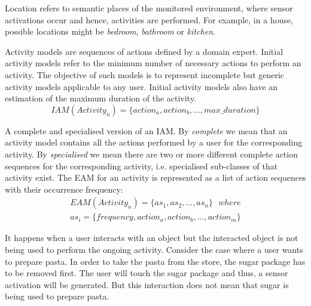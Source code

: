 \begin{defn}[Location]
\label{def-location}
 Location refers to semantic places of the monitored environment, where sensor activations occur and hence, activities are performed. For example, in a house, possible locations might be \textit{bedroom}, \textit{bathroom} or \textit{kitchen}. 
\end{defn}

\begin{defn}
\label{def-iam}
Activity models are sequences of actions defined by a domain expert. Initial activity models refer to the minimum number of necessary actions to perform an activity. The objective of such models is to represent incomplete but generic activity models applicable to any user. Initial activity models also have an estimation of the maximum duration of the activity.
\begin{equation}
  IAM(Activity_n) = \{action_a, action_b, \ldots , max\_duration\}
 \end{equation} 
\end{defn}

\begin{defn}
\label{def-eam}
 A complete and specialised version of an IAM. By \textit{complete} we mean that an activity model contains all the actions performed by a user for the corresponding activity. By \textit{specialised} we mean there are two or more different complete action sequences for the corresponding activity, i.e. specialised sub-classes of that activity exist. The EAM for an activity is represented as a list of action sequences with their occurrence frequency:
\begin{equation}
 \begin{split}
 EAM(Activity_n) = \{as_1, as_2, \ldots , as_n\} \ \ \ where \\
 as_i = \{frequency, action_a, action_b, \ldots, action_m\}
 \end{split}
 \label{eq-eam}
\end{equation}
\end{defn}

\begin{defn}
\label{def-erratic}
 It happens when a user interacts with an object but the interacted object is not being used to perform the ongoing activity. Consider the case where a user wants to prepare pasta. In order to take the pasta from the store, the sugar package has to be removed first. The user will touch the sugar package and thus, a sensor activation will be generated. But this interaction does not mean that sugar is being used to prepare pasta. 
\end{defn}


